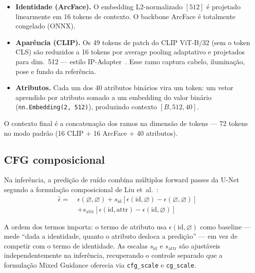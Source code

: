 \documentclass[10pt,twocolumn]{article}
\begin{document}
\begin{itemize}
  \item \textbf{Identidade (ArcFace).} O embedding L2-normalizado $[512]$
    é projetado linearmente em 16 tokens de contexto. O backbone ArcFace
    é totalmente congelado (ONNX).
  \item \textbf{Aparência (CLIP).} Os 49 tokens de patch do CLIP ViT-B/32
    (sem o token CLS) são reduzidos a 16 tokens por average pooling
    adaptativo e projetados para dim.~512 --- estilo
    IP-Adapter~\cite{ye2023}. Esse ramo captura cabelo, iluminação, pose
    e fundo da referência.
  \item \textbf{Atributos.} Cada um dos 40 atributos binários vira um
    token: um vetor aprendido por atributo somado a um embedding do valor
    binário (\texttt{nn.Embedding(2, 512)}), produzindo contexto
    $[B, 512, 40]$.
\end{itemize}

O contexto final é a concatenação dos ramos na dimensão de tokens ---
72 tokens no modo padrão (16 CLIP $+$ 16 ArcFace $+$ 40 atributos).

\subsection{CFG composicional}
\label{sec:cfg-composicional}

Na inferência, a predição de ruído combina múltiplos forward passes da
U-Net segundo a formulação composicional de Liu et~al.~\cite{liu2022}:
\begin{equation}
\label{eq:composable}
\begin{split}
\hat{\epsilon} = \; & \epsilon(\varnothing,\varnothing)
  + s_{\mathrm{id}}\left[\epsilon(\mathrm{id},\varnothing)
      - \epsilon(\varnothing,\varnothing)\right] \\
  & + s_{\mathrm{attr}}\left[\epsilon(\mathrm{id},\mathrm{attr})
      - \epsilon(\mathrm{id},\varnothing)\right]
\end{split}
\end{equation}

A ordem dos termos importa: o termo de atributo usa
$\epsilon(\mathrm{id},\varnothing)$ como baseline --- mede ``dada a
identidade, quanto o atributo desloca a predição'' --- em vez de competir
com o termo de identidade. As escalas $s_{\mathrm{id}}$ e
$s_{\mathrm{attr}}$ são ajustáveis independentemente na inferência,
recuperando o controle separado que a formulação Mixed Guidance oferecia
via \texttt{cfg\_scale} e \texttt{cg\_scale}.
\end{document}
